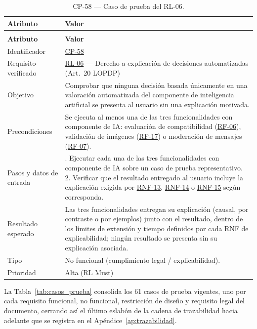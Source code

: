 \documentclass[journal,onecolumn]{IEEEtran}
\makeatletter
\newenvironment{atributos}[2]{%
	\small
	\begin{longtable}{@{}>{\raggedright\arraybackslash}p{4.2cm} >{\raggedright\arraybackslash}p{11.2cm}@{}}
		\caption{#2}\label{tab:#1}\\
		\toprule
		\textbf{Atributo} & \textbf{Valor} \\
		\midrule
		\endfirsthead
		\multicolumn{2}{@{}l}{\small\itshape (continuación)}\\
		\toprule
		\textbf{Atributo} & \textbf{Valor} \\
		\midrule
		\endhead
		\bottomrule
		\endlastfoot
	}{%
	\end{longtable}
	\normalsize
}
\makeatother
\begin{document}
	\begin{atributos}{CP-58}{CP-58 --- Caso de prueba del RL-06.}
		Identificador & \hyperref[tab:CP-58]{CP-58} \\
		Requisito verificado & \hyperref[rl:06]{RL-06} --- Derecho a explicación de decisiones automatizadas (Art.\ 20 LOPDP) \\
		Objetivo & Comprobar que ninguna decisión basada únicamente en una valoración automatizada del componente de inteligencia artificial se presenta al usuario sin una explicación motivada. \\
		Precondiciones & Se ejecuta al menos una de las tres funcionalidades con componente de IA: evaluación de compatibilidad (\hyperref[tab:RF-06]{RF-06}), validación de imágenes (\hyperref[tab:RF-17]{RF-17}) o moderación de mensajes (\hyperref[tab:RF-07]{RF-07}). \\
		Pasos y datos de entrada & 1. Ejecutar cada una de las tres funcionalidades con componente de IA sobre un caso de prueba representativo. 2. Verificar que el resultado entregado al usuario incluye la explicación exigida por \hyperref[tab:RNF-13]{RNF-13}, \hyperref[tab:RNF-14]{RNF-14} o \hyperref[tab:RNF-15]{RNF-15} según corresponda. \\
		Resultado esperado & Las tres funcionalidades entregan su explicación (causal, por contraste o por ejemplos) junto con el resultado, dentro de los límites de extensión y tiempo definidos por cada RNF de explicabilidad; ningún resultado se presenta sin su explicación asociada. \\
		Tipo & No funcional (cumplimiento legal / explicabilidad). \\
		Prioridad & Alta (RL Must) \\
	\end{atributos}

	La Tabla~\ref{tab:casos_prueba} consolida los 61 casos de prueba vigentes,
	uno por cada requisito funcional, no funcional, restricción de diseño y
	requisito legal del documento, cerrando así el último eslabón de la
	cadena de trazabilidad hacia adelante que se registra en el
	Apéndice~\ref{ap:trazabilidad}.
\end{document}
